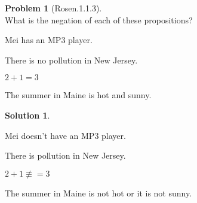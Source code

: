 \documentclass{article}
\theoremstyle{definition}
\newtheorem*{problem}{Problem}
\newtheorem*{solution}{Solution}
\begin{document}
\begin{problem}[Rosen.1.1.3]\ \\
What is the negation of each of these propositions?
\begin{compactenum}
\renewcommand{\theenumi}{\alph{enumi}}
\item Mei has an MP3 player.
\item There is no pollution in New Jersey.
\item $2 + 1 = 3$
\item The summer in Maine is hot and sunny.
\end{compactenum}
\end{problem}

\begin{solution}\ \\
\begin{compactenum}
\renewcommand{\theenumi}{\alph{enumi}}
\item Mei doesn't have an MP3 player.
\item There is pollution in New Jersey.
\item $2 + 1 \not\equiv = 3$
\item The summer in Maine is not hot or it is not sunny.
\end{compactenum}
\end{solution}
\end{document}
